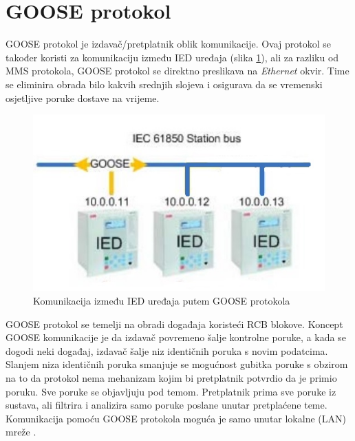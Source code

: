 \documentclass[times, utf8, zavrsni]{fer}
\begin{document}

\clearpage

\section{GOOSE protokol}
GOOSE protokol  je izdavač/pret\-pla\-tnik oblik komunikacije. Ovaj protokol se također koristi za komunikaciju između IED uređaja (slika \ref{fig:iec-goose-simple}), ali za razliku od MMS protokola, GOOSE protokol se direktno preslikava na \textit{Ethernet} okvir. Time se eliminira obrada bilo kakvih srednjih slojeva i osigurava da se vremenski osjetljive poruke dostave na vrijeme.

\begin{figure}[tph]
    \centering
    \includegraphics[scale=0.6]{img/IEC61850-GOOSE-simple.jpg}
    \caption{Komunikacija između IED uređaja putem GOOSE protokola\footnotemark}
    \label{fig:iec-goose-simple}
\end{figure}

GOOSE protokol se temelji na obradi događaja koristeći RCB blokove. Koncept GOOSE komunikacije je da izdavač povremeno šalje kontrolne poruke, a kada se dogodi neki događaj, izdavač šalje niz identičnih poruka s novim podatcima. Slanjem niza identičnih poruka smanjuje se mogućnost gubitka poruke s obzirom na to da protokol nema mehanizam kojim bi pretplatnik potvrdio da je primio poruku. Sve poruke se objavljuju pod temom. Pretplatnik prima sve poruke iz sustava, ali filtrira i analizira samo poruke poslane unutar pretplaćene teme. Komunikacija pomoću GOOSE protokola moguća je samo unutar lokalne (LAN) mreže \citep{typhoon:GOOSE}.
\end{document}
